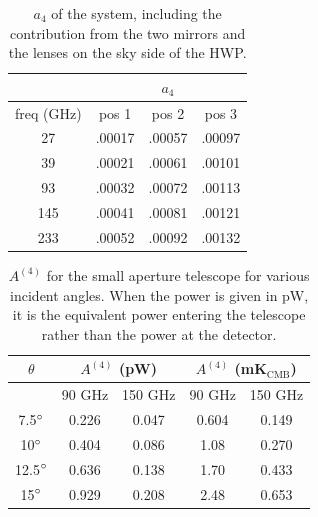\documentclass{article}
\theoremstyle{remark}
\newcommand{\A}[1]{A^{(#1)}}
\begin{document}
\begin{table}
\centering
\begin{tabular}{ |c|c|c|c| } 
	\hline
	 & \multicolumn{3}{|c|}{$a_4$}\\
	\hline
	freq (GHz) & pos 1 	& pos 2 & pos 3 \\ \hline
	27 & .00017 & .00057 & .00097\\
	39 & .00021 & .00061 & .00101\\
	93 & .00032 & .00072 & .00113\\
	145 & .00041 & .00081 & .00121\\
	233 & .00052 & .00092 & .00132\\
	\hline	
\end{tabular}

\caption{ $a_4$ of the system, including the contribution from the two mirrors and the lenses on the sky side of the HWP.
}
\label{table:SO_a4}
\end{table}





\begin{table}[h]
\centering

\begin{tabular}{|c|c|c|c|c|}
\hline
$\theta$ & \multicolumn{2}{|c|}{$\A4 $ (pW)}&  \multicolumn{2}{|c|}{$\A4 $ (mK$_\text{CMB}$)} \\
\hline
      & 90 GHz   & 150 GHz  & 90 GHz & 150 GHz         \\
\hline
7.5$\degree$  & 0.226 & 0.047 & 0.604 & 0.149\\
10$\degree$  & 0.404 & 0.086 & 1.08  & 0.270\\
12.5$\degree$  & 0.636 & 0.138 & 1.70  & 0.433\\
15$\degree$  & 0.929 & 0.208 & 2.48  & 0.653\\\hline
\end{tabular}
\caption{ $\A4$ for the small aperture telescope for various incident angles. 
When the power is given in pW, it is the equivalent power entering the telescope rather than the power at the detector.
}
\label{table:smallAp_A4}
\end{table}




\printbibliography
\end{document}
